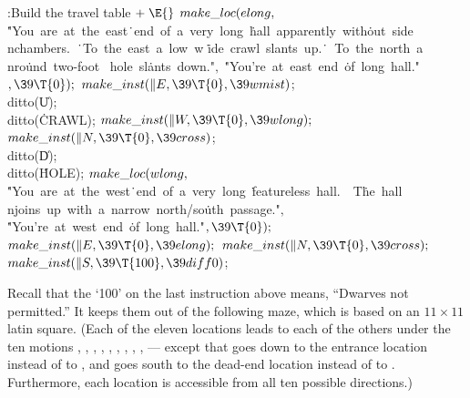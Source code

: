 \Y\B\4:Build the travel table\X${}\mathrel+\E{}$\6
$\\{make\_loc}(\\{elong},{}$\6
\.{"You\ are\ at\ the\ east}\)\.{\ end\ of\ a\ very\ long\ }\)\.{hall\
apparently\ with}\)\.{out\ side\\nchambers.\ }\)\.{\ To\ the\ east\ a\ low\ w}%
\)\.{ide\ crawl\ slants\ up.}\)\.{\ \ To\ the\ north\ a\\nro}\)\.{und\ two-foot%
\ hole\ sl}\)\.{ants\ down."}${},{}$\6
\.{"You're\ at\ east\ end\ }\)\.{of\ long\ hall."}${},\39\T{0});{}$\6
${}\\{make\_inst}(\|E,\39\T{0},\39\\{wmist}){}$;\5
\\{ditto}(\|U);\5
\\{ditto}(\.{CRAWL});\6
${}\\{make\_inst}(\|W,\39\T{0},\39\\{wlong});{}$\6
${}\\{make\_inst}(\|N,\39\T{0},\39\\{cross}){}$;\5
\\{ditto}(\|D);\5
\\{ditto}(\.{HOLE});\7
${}\\{make\_loc}(\\{wlong},{}$\6
\.{"You\ are\ at\ the\ west}\)\.{\ end\ of\ a\ very\ long\ }\)\.{featureless\
hall.\ \ T}\)\.{he\ hall\\njoins\ up\ wi}\)\.{th\ a\ narrow\ north/so}\)\.{uth\
passage."}${},{}$\6
\.{"You're\ at\ west\ end\ }\)\.{of\ long\ hall."}${},\39\T{0});{}$\6
${}\\{make\_inst}(\|E,\39\T{0},\39\\{elong});{}$\6
${}\\{make\_inst}(\|N,\39\T{0},\39\\{cross});{}$\6
${}\\{make\_inst}(\|S,\39\T{100},\39\\{diff0}){}$;\par
\fi

Recall that the `100' on the last instruction above means,
``Dwarves
not permitted.'' It keeps them out of the following maze, which is
based on an $11\times11$ latin square. (Each of the eleven locations
leads to each of the others under the ten motions , , ,
\PB{\|W},
\PB{\.{NE}}, \PB{\.{SE}}, \PB{\.{NW}}, \PB{\.{SW}}, \PB{\|U},  ---
except that \PB{\\{diff0}} goes down to
the entrance location  instead of to , and \PB{%
\\{diff10}} goes
south to the dead-end location  instead of to .
Furthermore,
each location is accessible from all ten possible directions.)

